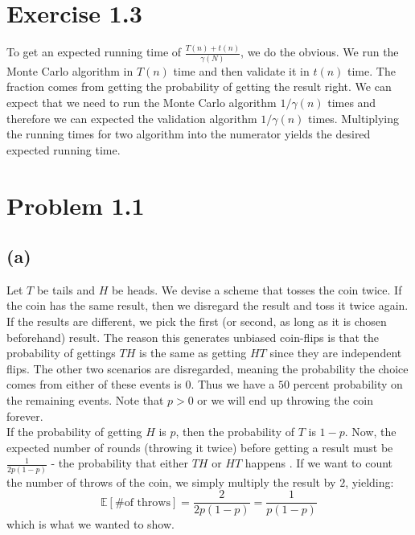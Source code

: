 \documentclass[a4paper]{article}
\begin{document}
\section*{Exercise 1.3}
To get an expected running time of $\frac{T(n)+t(n)}{\gamma (N)}$, we do the obvious. We run the Monte Carlo algorithm in $T(n)$ time and then validate it in $t(n)$ time. The fraction comes from getting the probability of getting the result right. We can expect that we need to run the Monte Carlo algorithm $1/\gamma (n)$ times and therefore we can expected the validation algorithm $1/\gamma (n)$ times. Multiplying the running times for two algorithm into the numerator yields the desired expected running time.

\section*{Problem 1.1}
\subsection*{(a)}
Let $T$ be tails and $H$ be heads. We devise a scheme that tosses the coin twice. If the coin has the same result, then we disregard the result and toss it twice again. If the results are different, we pick the first (or second, as long as it is chosen beforehand) result. The reason this generates unbiased coin-flips is that the probability of gettings $TH$ is the same as getting $HT$ since they are independent flips. The other two scenarios are disregarded, meaning the probability the choice comes from either of these events is $0$. Thus we have a $50$ percent probability on the remaining events. Note that $p>0$ or we will end up throwing the coin forever.\\
If the probability of getting $H$ is $p$, then the probability of $T$ is $1-p$. Now, the expected number of rounds  (throwing it twice) before getting a result must be $\frac{1}{2p(1-p)}$ - the probability that either $TH$ or $HT$ happens . If we want to count the number of throws of the coin, we simply multiply the result by $2$, yielding:
$$
\mathbb{E}\left[ \mbox{\# of throws} \right]=\frac{2}{2p(1-p)}=\frac{1}{p(1-p)}
$$
which is what we wanted to show.
\end{document}
